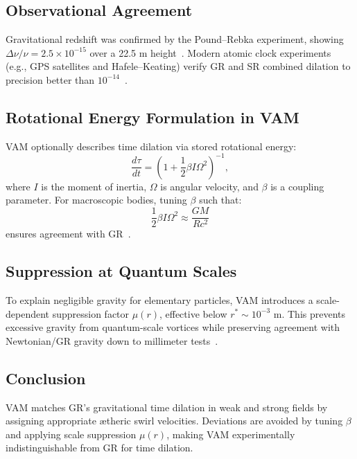 \subsection*{Observational Agreement}
Gravitational redshift was confirmed by the Pound–Rebka experiment, showing $\Delta\nu/\nu = 2.5\times 10^{-15}$ over a 22.5 m height~\cite{pound1960apparent}. Modern atomic clock experiments (e.g., GPS satellites and Hafele–Keating) verify GR and SR combined dilation to precision better than $10^{-14}$~\cite{ashby2003relativity}.

\subsection*{Rotational Energy Formulation in VAM}
VAM optionally describes time dilation via stored rotational energy:
\[
    \frac{d\tau}{dt} = \left(1 + \frac{1}{2}\beta I \Omega^2\right)^{-1},
\]
where $I$ is the moment of inertia, $\Omega$ is angular velocity, and $\beta$ is a coupling parameter. For macroscopic bodies, tuning $\beta$ such that:
\[
    \frac{1}{2} \beta I \Omega^2 \approx \frac{GM}{Rc^2}
\]
ensures agreement with GR~\cite{iskandarani2025VAM2}.

\subsection*{Suppression at Quantum Scales}
To explain negligible gravity for elementary particles, VAM introduces a scale-dependent suppression factor $\mu(r)$, effective below $r^* \sim 10^{-3}$ m. This prevents excessive gravity from quantum-scale vortices while preserving agreement with Newtonian/GR gravity down to millimeter tests~\cite{adelberger2003tests}.

\subsection*{Conclusion}
VAM matches GR's gravitational time dilation in weak and strong fields by assigning appropriate ætheric swirl velocities. Deviations are avoided by tuning $\beta$ and applying scale suppression $\mu(r)$, making VAM experimentally indistinguishable from GR for time dilation.